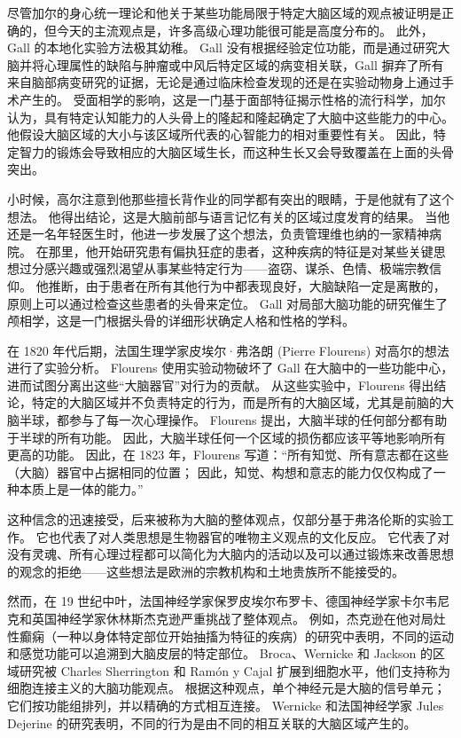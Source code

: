 尽管加尔的身心统一理论和他关于某些功能局限于特定大脑区域的观点被证明是正确的，但今天的主流观点是，许多高级心理功能很可能是高度分布的。 
此外，Gall 的本地化实验方法极其幼稚。 
Gall 没有根据经验定位功能，而是通过研究大脑并将心理属性的缺陷与肿瘤或中风后特定区域的病变相关联，Gall 摒弃了所有来自脑部病变研究的证据，无论是通过临床检查发现的还是在实验动物身上通过手术产生的。 
受面相学的影响，这是一门基于面部特征揭示性格的流行科学，加尔认为，具有特定认知能力的人头骨上的隆起和隆起确定了大脑中这些能力的中心。 
他假设大脑区域的大小与该区域所代表的心智能力的相对重要性有关。 
因此，特定智力的锻炼会导致相应的大脑区域生长，而这种生长又会导致覆盖在上面的头骨突出。


小时候，高尔注意到他那些擅长背作业的同学都有突出的眼睛，于是他就有了这个想法。 
他得出结论，这是大脑前部与语言记忆有关的区域过度发育的结果。 
当他还是一名年轻医生时，他进一步发展了这个想法，负责管理维也纳的一家精神病院。 
在那里，他开始研究患有偏执狂症的患者，这种疾病的特征是对某些关键思想过分感兴趣或强烈渴望从事某些特定行为——盗窃、谋杀、色情、极端宗教信仰。 
他推断，由于患者在所有其他行为中都表现良好，大脑缺陷一定是离散的，原则上可以通过检查这些患者的头骨来定位。 
Gall 对局部大脑功能的研究催生了颅相学，这是一门根据头骨的详细形状确定人格和性格的学科。


在 1820 年代后期，法国生理学家皮埃尔·弗洛朗 (Pierre Flourens) 对高尔的想法进行了实验分析。 
Flourens 使用实验动物破坏了 Gall 在大脑中的一些功能中心，进而试图分离出这些“大脑器官”对行为的贡献。 
从这些实验中，Flourens 得出结论，特定的大脑区域并不负责特定的行为，而是所有的大脑区域，尤其是前脑的大脑半球，都参与了每一次心理操作。 
Flourens 提出，大脑半球的任何部分都有助于半球的所有功能。 
因此，大脑半球任何一个区域的损伤都应该平等地影响所有更高的功能。 
因此，在 1823 年，Flourens 写道：“所有知觉、所有意志都在这些（大脑）器官中占据相同的位置； 因此，知觉、构想和意志的能力仅仅构成了一种本质上是一体的能力。”


这种信念的迅速接受，后来被称为大脑的整体观点，仅部分基于弗洛伦斯的实验工作。 
它也代表了对人类思想是生物器官的唯物主义观点的文化反应。 
它代表了对没有灵魂、所有心理过程都可以简化为大脑内的活动以及可以通过锻炼来改善思想的观念的拒绝——这些想法是欧洲的宗教机构和土地贵族所不能接受的。


然而，在 19 世纪中叶，法国神经学家保罗皮埃尔布罗卡、德国神经学家卡尔韦尼克和英国神经学家休林斯杰克逊严重挑战了整体观点。 
例如，杰克逊在他对局灶性癫痫（一种以身体特定部位开始抽搐为特征的疾病）的研究中表明，不同的运动和感觉功能可以追溯到大脑皮层的特定部位。 
Broca、Wernicke 和 Jackson 的区域研究被 Charles Sherrington 和 Ramón y Cajal 扩展到细胞水平，他们支持称为细胞连接主义的大脑功能观点。 根据这种观点，单个神经元是大脑的信号单元； 
它们按功能组排列，并以精确的方式相互连接。 Wernicke 和法国神经学家 Jules Dejerine 的研究表明，不同的行为是由不同的相互关联的大脑区域产生的。


